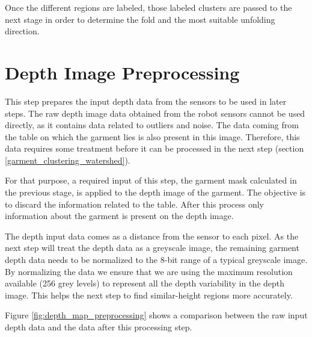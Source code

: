 Once the different regions are labeled, those labeled clusters are passed to the next stage in order to determine the fold and the most suitable unfolding direction.

\section{Depth Image Preprocessing}
\label{depth_image_preprocessing}

This step prepares the input depth data from the sensors to be used in later steps. The raw depth image data obtained from the robot sensors cannot be used directly, as it contains data related to outliers and noise. The data coming from the table on which the garment lies is also present in this image. Therefore, this data requires some treatment before it can be processed in the next step (section \ref{garment_clustering_watershed}). 

For that purpose, a required input of this step, the garment mask calculated in the previous stage, is applied to the depth image of the garment. The objective is to discard the information related to the table. After this process only information about the garment is present on the depth image.

The depth input data comes as a distance from the sensor to each pixel. As the next step will treat the depth data as a greyscale image, the remaining garment depth data needs to be normalized to the 8-bit range of a typical greyscale image. By normalizing the data we ensure that we are using the maximum resolution available (256 grey levels) to represent all the depth variability in the depth image. This helps the next step to find similar-height regions more accurately.

Figure \ref{fig:depth_map_preprocessing}  shows a comparison between the raw input depth data and the data after this processing step. 


